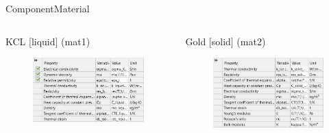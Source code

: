 \documentclass[10pt]{beamer}
\begin{document}
\begin{frame}{Component}{Material}
    \begin{columns}[onlytextwidth]
        \begin{column}{0.5\textwidth}
            KCL [liquid] (mat1)
            \begin{figure}[H]
                \centering
                \includegraphics[width=0.9\columnwidth]{2.png}
            \end{figure}
        \end{column}
        \begin{column}{0.5\textwidth}
            Gold [solid] (mat2)
            \begin{figure}[H]
                \centering
                \includegraphics[width=0.9\columnwidth]{3.png}
            \end{figure}
        \end{column}
    \end{columns}
\end{frame}
\end{document}
